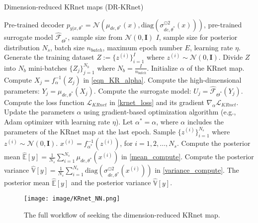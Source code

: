 \begin{algorithm}[H]
	\caption{Dimension-reduced KRnet maps (DR-KRnet)}
	\label{alg_krnet}
	\begin{algorithmic}[1]
		\Require Pre-trained decoder $p_{y|x,\theta^*}=\mathcal{N}\left(\mu_{de,\theta^*}\left(x\right), \text{diag}\left(\sigma_{de,\theta^*}^{\odot 2}\left(x\right)\right)\right)$, pre-trained surrogate model $\hat{\mathcal{F}}_{\Theta^*}$, sample size from $\mathcal{N}(0,\mathbf{I})$ $I$, sample size for posterior distribution $N_s$, batch size $n_{batch}$, maximum epoch number $E$, learning rate $\eta$.
  \State Generate the training dataset $Z:=\{z^{(i)}\}_{i=1}^I$ where $z^{(i)}\sim \mathcal{N}(0,\mathbf{I})$.
  \State Divide $Z$ into $N_b$ mini-batches $\{Z_j\}_{j=1}^{N_b}$ where $N_b=\frac{I}{n_{batch}}$.
  \State Initialize $\alpha$ of the KRnet map.
		\State Compute $X_j=f_{\alpha}^{-1}(Z_j)$ in  \eqref{eqn_KR_alpha}.
            \State Compute the high-dimensional parameters: $Y_j=\mu_{de,\theta^*}(X_j).$
		\State Compute the surrogate model: $U_j=\hat{\mathcal{F}}_{\Theta^*}(Y_j).$
		\State Compute the loss function $\mathcal{L}_{KRnet}$ in  \eqref{krnet_loss} and its gradient $\nabla_{\alpha}\mathcal{L}_{KRnet}$.
		\State Update the parameters $\alpha$ using gradient-based optimization algorithm (e.g., Adam optimizer \cite{kingma2014adam} with learning rate $\eta$).
		\EndFor
		\EndFor
  \State Let $\alpha^*=\alpha$, where $\alpha$ includes the parameters of the KRnet map at the last epoch.
		\State Sample $\{z^{(i)}\}_{i=1}^{N_s} $ where $z^{(i)}\sim \mathcal{N}(0,\mathbf{I})$.
		\State $x^{(i)}=f_{\alpha^*}^{-1}\left(z^{(i)}\right)$, for $i=1,2,\dots,N_s$.
		\State Compute the posterior mean $\hat{\mathbb{E}}[y]=\frac{1}{N_s}\sum_{i=1}^{N_s} \mu_{de,\theta^*}\left(x^{(i)}\right)$ in  \eqref{mean_compute}.
             \State Compute the posterior variance $\hat{\mathbb{V}}[y]=\frac{1}{N_s}\sum_{i=1}^{N_s} \text{diag}\left(\sigma_{de,\theta^*}^{\odot 2}\left(x^{(i)}\right)\right)$ in  \eqref{variance_compute}.
		\Ensure The posterior mean $\hat{\mathbb{E}}[y]$ and the posterior variance $\hat{\mathbb{V}}[y]$.
	\end{algorithmic}
\end{algorithm}
\begin{figure}
	\centering
	\texttt{[image: image/KRnet\_NN.png]}
	\caption{The full workflow of seeking the dimension-reduced KRnet map.}
	\label{krnet_flow}
\end{figure}